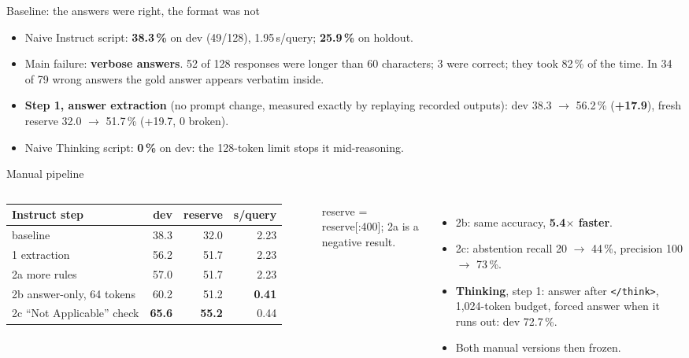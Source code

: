\documentclass[aspectratio=169,10pt]{beamer}
\begin{document}
\begin{frame}{Baseline: the answers were right, the format was not}
\begin{itemize}
  \item Naive Instruct script: \textbf{38.3\,\%} on dev (49/128), 1.95\,s/query; \textbf{25.9\,\%} on holdout.
  \item Main failure: \textbf{verbose answers}. 52 of 128 responses were longer than 60 characters; 3 were correct;
        they took 82\,\% of the time. In 34 of 79 wrong answers the gold answer appears verbatim inside.
  \item \textbf{Step 1, answer extraction} (no prompt change, measured exactly by replaying recorded outputs):
        dev 38.3 $\rightarrow$ 56.2\,\% (\textbf{+17.9}), fresh reserve 32.0 $\rightarrow$ 51.7\,\% (+19.7, 0 broken).
  \item Naive Thinking script: \textbf{0\,\%} on dev: the 128-token limit stops it mid-reasoning.
\end{itemize}
\end{frame}

\begin{frame}{Manual pipeline}
\begin{columns}[T]
\small
\begin{tabular}{@{}lrrr@{}}
\toprule
Instruct step & dev & reserve & s/query \\
\midrule
baseline & 38.3 & 32.0 & 2.23 \\
1 extraction & 56.2 & 51.7 & 2.23 \\
2a more rules & 57.0 & 51.7 & 2.23 \\
2b answer-only, 64 tokens & 60.2 & 51.2 & \textbf{0.41} \\
2c ``Not Applicable'' check & \textbf{65.6} & \textbf{55.2} & 0.44 \\
\bottomrule
\end{tabular}
\vspace{0.3em}

\footnotesize reserve = reserve[:400]; 2a is a negative result.
\small
\begin{itemize}
  \item 2b: same accuracy, \textbf{5.4$\times$ faster}.
  \item 2c: abstention recall 20 $\rightarrow$ 44\,\%, precision 100 $\rightarrow$ 73\,\%.
  \item \textbf{Thinking}, step 1: answer after \texttt{</think>}, 1{,}024-token budget, forced answer when it
        runs out: dev 72.7\,\%.
  \item Both manual versions then frozen.
\end{itemize}
\end{columns}
\end{frame}
\end{document}
